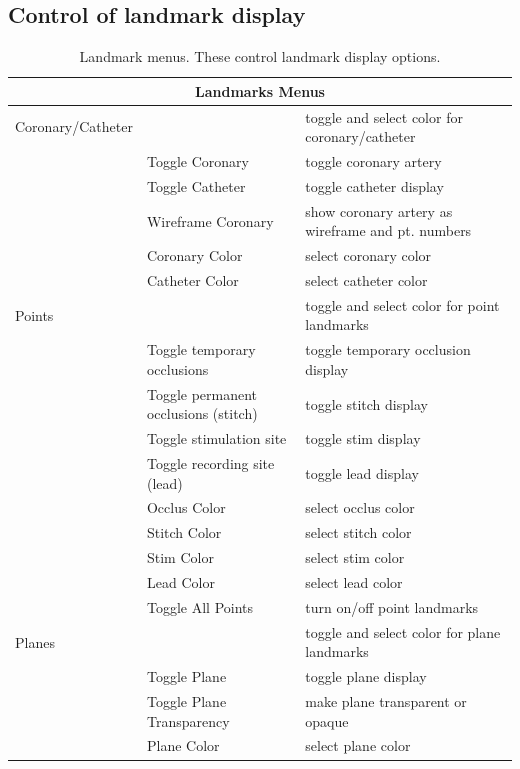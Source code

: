 \subsection{Control of landmark display}
\label{sec:control-landmarks} 


\begin{table}[ht]
\caption{\label{table:landmarks} Landmark menus.  These control landmark
    display options.} 
  \begin{center}
    \begin{tabular}{|l|p{1.5in}|p{3 in}|} \hline
      \multicolumn{3}{|c|}{\textbf{Landmarks Menus}} \\ \hline
    Coronary/Catheter & & toggle and select color for coronary/catheter\\
    & Toggle Coronary & toggle coronary artery \\
    & Toggle Catheter & toggle catheter display \\ 
    & Wireframe Coronary & show coronary artery as wireframe and pt. numbers\\
    & Coronary Color & select coronary color \\
    & Catheter Color & select catheter color \\ \hline
    Points & & toggle and select color for point landmarks\\
    & Toggle temporary occlusions & toggle temporary occlusion display\\
    & Toggle permanent occlusions (stitch) & toggle stitch display \\ 
    & Toggle stimulation site & toggle stim display \\ 
    & Toggle recording site (lead) & toggle lead display \\ 
    & Occlus Color & select occlus color \\
    & Stitch Color & select stitch color \\
    & Stim Color & select stim color \\
    & Lead Color & select lead color \\
    & Toggle All Points & turn on/off point landmarks \\ \hline
    Planes & & toggle and select color for plane landmarks \\
    & Toggle Plane & toggle plane display \\
    & Toggle Plane Transparency & make plane transparent or opaque \\
    & Plane Color & select plane color \\ \hline

\end{tabular}
\end{center}
\end{table}
